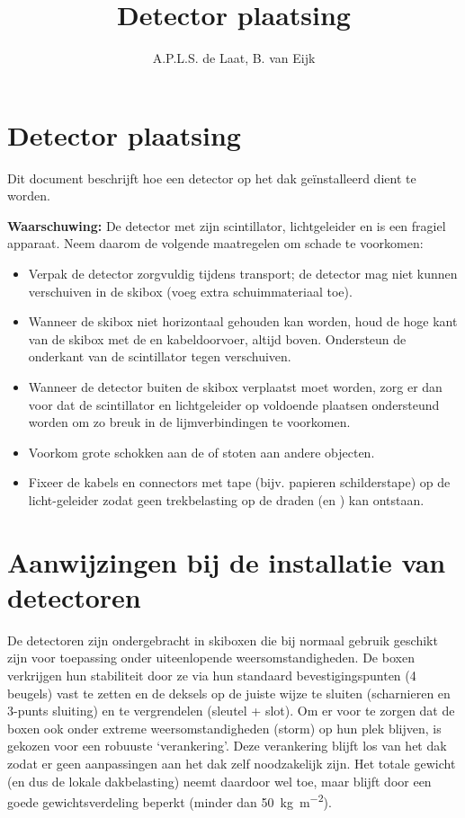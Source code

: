 

\title{Detector plaatsing}
\author{A.P.L.S. de Laat, B. van Eijk} 



\maketitle

\section{Detector plaatsing}

Dit document beschrijft hoe een \hisparc detector op het dak
geïnstalleerd dient te worden.

\textbf{Waarschuwing:} De \hisparc detector met zijn scintillator,
lichtgeleider en \pmt is een fragiel apparaat. Neem daarom de volgende
maatregelen om schade te voorkomen:

\begin{itemize}
    \item Verpak de detector zorgvuldig tijdens transport; de detector
    mag niet kunnen verschuiven in de skibox (voeg extra
    schuimmateriaal toe).
    \item Wanneer de skibox niet horizontaal gehouden kan worden, houd
    de hoge kant van de skibox met de \pmt en kabeldoorvoer, altijd
    boven. Ondersteun de onderkant van de scintillator tegen verschuiven.
    \item Wanneer de detector buiten de skibox verplaatst moet worden,
    zorg er dan voor dat de scintillator en lichtgeleider op voldoende
    plaatsen ondersteund worden om zo breuk in de lijmverbindingen te
    voorkomen.
    \item Voorkom grote schokken aan de \pmt of stoten aan andere
    objecten.
    \item Fixeer de \pmt kabels en connectors met tape (bijv. papieren
    schilderstape) op de licht-geleider zodat geen trekbelasting op de
    draden (en \pmt) kan ontstaan.
\end{itemize}


\section{Aanwijzingen bij de installatie van \hisparc detectoren}

De \hisparc detectoren zijn ondergebracht in skiboxen die bij normaal
gebruik geschikt zijn voor toepassing onder uiteenlopende
weersomstandigheden. De boxen verkrijgen hun stabiliteit door ze via hun
standaard bevestigingspunten (4 beugels) vast te zetten en de deksels op
de juiste wijze te sluiten (scharnieren en 3-punts sluiting) en te
vergrendelen (sleutel + slot). Om er voor te zorgen dat de boxen ook
onder extreme weersomstandigheden (storm) op hun plek blijven, is
gekozen voor een robuuste ‘verankering’. Deze verankering blijft los van
het dak zodat er geen aanpassingen aan het dak zelf noodzakelijk zijn.
Het totale gewicht (en dus de lokale dakbelasting) neemt daardoor wel
toe, maar blijft door een goede gewichtsverdeling beperkt (minder dan
\SI{50}{\kilo\gram\per\square\meter}).

